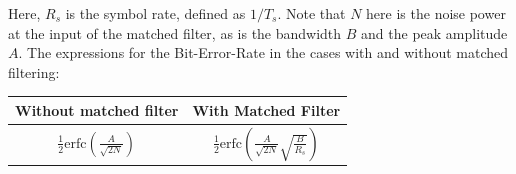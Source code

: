 \begin{refsection}
%
%


%



Here, $R_s$ is the symbol rate, defined as $1/T_s$. Note that $N$ here is the
noise power at the input of the matched filter, as is the bandwidth $B$ and the
peak amplitude $A$. The expressions for the Bit-Error-Rate in the cases with and
without matched filtering:

\begin{table}[H]
	\centering
	\begin{tabulary}{1.0\textwidth}{|c|c|}
		\hline
		\textbf{Without matched filter}								& \textbf{With Matched Filter} \\ \hline
		$ \frac{1}{2} \text{erfc} \left( \frac{A}{\sqrt{2N}} \right) $	& $ \frac{1}{2} \text{erfc}\left(\frac{A}{\sqrt{2N}} \sqrt{\frac{B}{R_s}}\right)  $ \\ \hline
	\end{tabulary}


\end{table}
\end{refsection}
